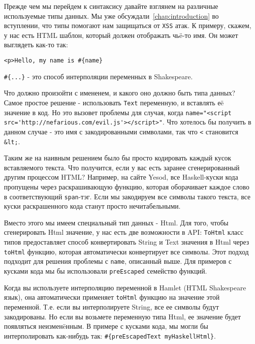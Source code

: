 Прежде чем мы перейдем к синтаксису давайте взглянем на различные используемые 
типы данных. Мы уже обсуждали~\ref{chap:introduction} во вступлении, что типы 
помогают нам защищаться от \texttt{XSS} атак. К примеру, скажем, 
у нас есть HTML шаблон, который должен отображать чьë-то имя. Он может выглядеть
как-то так:

\begin{lstlisting}
<p>Hello, my name is #{name}
\end{lstlisting}


\lstinline!#{...}! - это способ интерполяции переменных в Shakespeare.

Что должно произойти с имененем, и какого оно должно быть типа данных?
Самое простое решение - использовать \texttt{Text} переменную, и вставлять 
еë значение в код.  
Но это вызовет проблемы для случая, когда
\lstinline!name="<script src='http://nefarious.com/evil.js'></script>"!.
Что хотелось бы получить в данном случае - это имя с закодированными символами, 
так что 
\lstinline!<! становится \lstinline!&lt;!.

Таким же на наивным решением было бы просто кодировать каждый кусок 
вставляемого текста. Что получится, если у вас есть заранее сгенерированный 
другим процессом HTML? Например, на сайте Yesod, все Haskell-куски кода 
пропущены через раскрашивающую функцию, которая оборачивает каждое слово
в соответствующий \texttt{span}-тэг. Если мы закодируем все символы такого 
текста, все куски раскрашенного кода станут просто нечитабельными.

Вместо этого мы имеем специальный тип данных - Html. Для того, чтобы сгенерировать
Html значение, у нас есть две возможности в API: \lstinline!ToHtml! класс типов
предоставляет способ конвертировать String и Text значения в Html через 
\lstinline!toHtml! функцию, которая автоматически конвертирует все символы.
Этот подход подходит для решения проблемы с \texttt{name}, описанный выше. Для
примеров с кусками кода мы бы использовали \lstinline!preEscaped! 
семейство функций.

Когда вы используете интерполяцию переменной в Hamlet (HTML Shakespeare язык), 
она автоматически применяет \lstinline!toHtml! функцию на значение 
этой переменной. Т.е. если вы интерполируете String, все ее символы 
будут закодированы. Но если вы возьмете переменную типа Html, ее значение
будет появляться неизменëнным. В примере с кусками кода, мы могли бы 
интерполировать как-нибудь так: \lstinline!#{preEscapedText myHaskellHtml}!.

